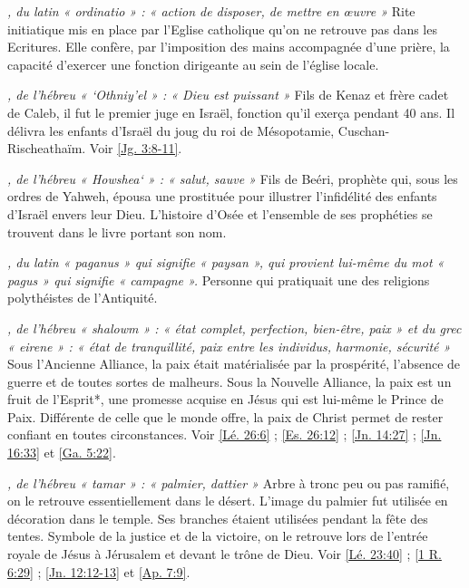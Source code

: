 \begin{multicols}{2}
\textit{, du latin « ordinatio » : « action de disposer, de mettre en œuvre »}\newline
Rite initiatique mis en place par l'Eglise catholique qu'on ne retrouve pas dans les Ecritures. Elle confère, par l'imposition des mains accompagnée d'une prière, la capacité d'exercer une fonction dirigeante au sein de l'église locale.

\textit{, de l'hébreu « `Othniy'el » : « Dieu est puissant »}\newline
Fils de Kenaz et frère cadet de Caleb, il fut le premier juge en Israël, fonction qu'il exerça pendant 40 ans. Il délivra les enfants d'Israël du joug du roi de Mésopotamie, Cuschan-Rischeathaïm. Voir \vref{Jg. 3:8-11}.

\textit{, de l'hébreu « Howshea` » : « salut, sauve »}\newline
Fils de Beéri, prophète qui, sous les ordres de Yahweh, épousa une prostituée pour illustrer l'infidélité des enfants d'Israël envers leur Dieu. L'histoire d'Osée et l'ensemble de ses prophéties se trouvent dans le livre portant son nom.

\textit{, du latin « paganus » qui signifie « paysan », qui provient lui-même du mot « pagus » qui signifie « campagne ».}\newline
Personne qui pratiquait une des religions polythéistes de l'Antiquité.

\textit{, de l'hébreu « shalowm » : « état complet, perfection, bien-être, paix » et du grec « eirene » : « état de tranquillité, paix entre les individus, harmonie, sécurité »}\newline
Sous l'Ancienne Alliance, la paix était matérialisée par la prospérité, l'absence de guerre et de toutes sortes de malheurs. Sous la Nouvelle Alliance, la paix est un fruit de l'Esprit*, une promesse acquise en Jésus qui est lui-même le Prince de Paix. Différente de celle que le monde offre, la paix de Christ permet de rester confiant en toutes circonstances. Voir \vref{Lé. 26:6} ; \vref{Es. 26:12} ; \vref{Jn. 14:27} ; \vref{Jn. 16:33} et \vref{Ga. 5:22}.

\textit{, de l'hébreu « tamar » : « palmier, dattier »}\newline
Arbre à tronc peu ou pas ramifié, on le retrouve essentiellement dans le désert. L'image du palmier fut utilisée en décoration dans le temple. Ses branches étaient utilisées pendant la fête des tentes. Symbole de la justice et de la victoire, on le retrouve lors de l'entrée royale de Jésus à Jérusalem et devant le trône de Dieu. Voir \vref{Lé. 23:40} ; \vref{1 R. 6:29} ; \vref{Jn. 12:12-13} et \vref{Ap. 7:9}.


\end{multicols}
